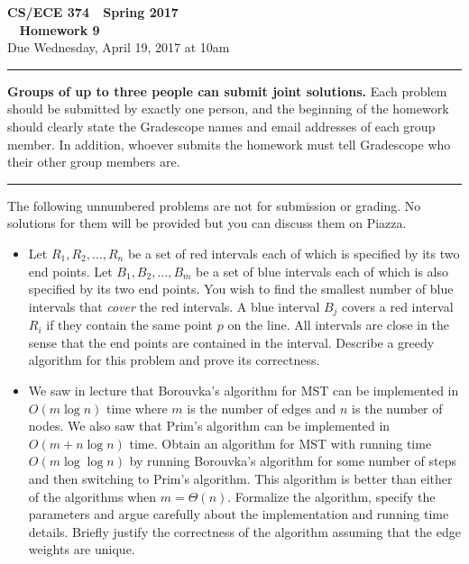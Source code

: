 \documentclass[11pt]{article}
\begin{document}

\thispagestyle{empty}

\begin{center}
\Large\textbf{CS/ECE 374 \,\decosix\,  Spring 2017}%
\\
\LARGE\textbf{\decothreeleft~ Homework 9 ~\decothreeright}%
\\[0.5ex]
\large Due Wednesday, April 19, 2017 at 10am
\end{center}

\bigskip
\hrule
\bigskip

\noindent
\textbf{Groups of up to three people can submit joint solutions.}  Each problem should be submitted by exactly one person, and the beginning of the homework should clearly state the Gradescope names and email addresses of each group member.  In addition, whoever submits the homework must tell Gradescope who their other group members are.
\bigskip
\hrule
\bigskip


\noindent
The following unnumbered problems are not for submission or grading. 
No solutions for them will be provided but you can discuss them on Piazza.
\begin{itemize}
\item  Let $R_1,R_2,\ldots,R_n$ be a set of red intervals each of which
  is specified by its two end points.  Let $B_1,B_2,\ldots, B_m$ be a
  set of blue intervals each of which is also specified by its two end
  points. You wish to find the smallest number of blue intervals that
  {\em cover} the red intervals. A blue interval $B_j$ covers a red
  interval $R_i$ if they contain the same point $p$ on the line.  All
  intervals are close in the sense that the end points are contained
  in the interval. Describe a greedy algorithm for this problem and
  prove its correctness.


\item We saw in lecture that Borouvka's algorithm for MST can be
  implemented in $O(m \log n)$ time where $m$ is the number of edges
  and $n$ is the number of nodes. We also saw that Prim's algorithm
  can be implemented in $O(m + n \log n)$ time. Obtain an algorithm
  for MST with running time $O(m \log \log n)$ by running Borouvka's
  algorithm for some number of steps and then switching to Prim's
  algorithm. This algorithm is better than either of the algorithms
  when $m = \Theta(n)$. Formalize the algorithm, specify the
  parameters and argue carefully about the implementation and running
  time details. Briefly justify the correctness of the algorithm
  assuming that the edge weights are unique.
\end{itemize}
\end{document}
